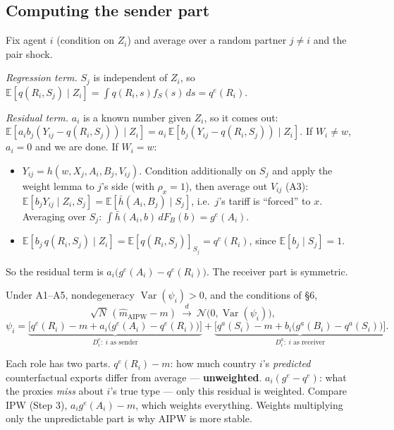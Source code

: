 \documentclass[11pt,a4paper]{article}
\theoremstyle{remark}
\newcommand{\E}{\mathbb{E}}
\newcommand{\Var}{\operatorname{Var}}
\newcommand{\1}{\mathbf{1}}
\newcommand{\qe}{q^{e}}
\newcommand{\qa}{q^{a}}
\newcommand{\gE}{g^{e}}
\newcommand{\gA}{g^{a}}
\begin{document}
\subsection{Computing the sender part}

Fix agent $i$ (condition on $Z_i$) and average over a random partner $j\neq i$ and the pair shock.

\emph{Regression term.} $S_j$ is independent of $Z_i$, so
$\E[q(R_i,S_j)\mid Z_i]=\int q(R_i,s)f_S(s)\,ds=\qe(R_i)$.

\emph{Residual term.} $a_i$ is a known number given $Z_i$, so it comes out:
$\E[a_ib_j(Y_{ij}-q(R_i,S_j))\mid Z_i]=a_i\,\E[b_j(Y_{ij}-q(R_i,S_j))\mid Z_i]$.
If $W_i\neq w$, $a_i=0$ and we are done. If $W_i=w$:
\begin{itemize}[leftmargin=*,nosep]
\item $Y_{ij}=h(w,X_j,A_i,B_j,V_{ij})$. Condition additionally on $S_j$ and apply the weight lemma to $j$'s side (with $\rho_x=1$), then average out $V_{ij}$ (A3):
$\E[b_jY_{ij}\mid Z_i,S_j]=\E[\bar h(A_i,B_j)\mid S_j]$, i.e.\ $j$'s tariff is ``forced'' to $x$.
Averaging over $S_j$: $\int\bar h(A_i,b)\,dF_B(b)=\gE(A_i)$.
\item $\E[b_j\,q(R_i,S_j)\mid Z_i]=\E[q(R_i,S_j)]_{S_j}=\qe(R_i)$, since $\E[b_j\mid S_j]=1$.
\end{itemize}
So the residual term is $a_i\big(\gE(A_i)-\qe(R_i)\big)$. The receiver part is symmetric.

\begin{resultbox}
Under A1--A5, nondegeneracy $\Var(\psi_i)>0$, and the conditions of \S6,
\[
\sqrt N\,(\hat m_{\mathrm{AIPW}}-m)\ \xrightarrow{d}\ \mathcal N\big(0,\Var(\psi_i)\big),
\]
\[
\psi_i=\underbrace{\Big[\qe(R_i)-m+a_i\big(\gE(A_i)-\qe(R_i)\big)\Big]}_{D^e_i:\ i\text{ as sender}}
+\underbrace{\Big[\qa(S_i)-m+b_i\big(\gA(B_i)-\qa(S_i)\big)\Big]}_{D^a_i:\ i\text{ as receiver}} .
\]
\end{resultbox}

\begin{intuitionbox}
Each role has two parts. $\qe(R_i)-m$: how much country $i$'s \emph{predicted} counterfactual exports differ from average --- \textbf{unweighted}. $a_i(\gE-\qe)$: what the proxies \emph{miss} about $i$'s true type --- only this residual is weighted. Compare IPW (Step 3), $a_i\gE(A_i)-m$, which weights everything. Weights multiplying only the unpredictable part is why AIPW is more stable.
\end{intuitionbox}
\end{document}
